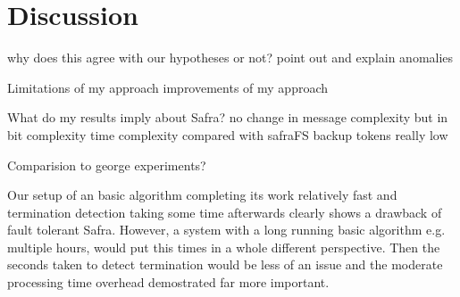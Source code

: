 \section{Discussion}

why does this agree with our hypotheses or not?
  point out and explain anomalies
  
Limitations of my approach
  improvements of my approach
  
What do my results imply about Safra?
  no change in message complexity
  but in bit complexity
  time complexity compared with safraFS
  backup tokens really low
  
  
  
Comparision to george experiments?

Our setup of an basic algorithm completing its work relatively fast and termination detection taking some time afterwards clearly shows a drawback of fault tolerant Safra.
However, a system with a long running basic algorithm e.g. multiple hours, would put this times in a whole different perspective.
Then the seconds taken to detect termination would be less of an issue and the moderate processing time overhead demostrated far more important.
